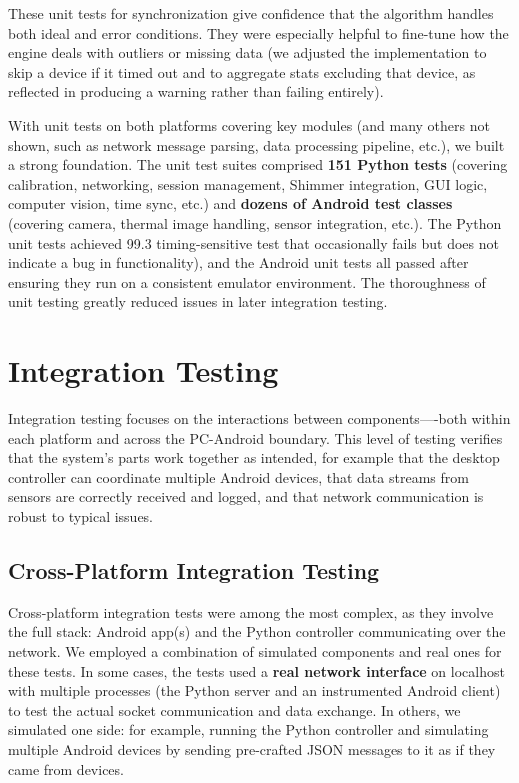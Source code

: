 \documentclass[11pt,a4paper]{report}
\begin{document}
These unit tests for synchronization give confidence that the algorithm
handles both ideal and error conditions. They were especially helpful to
fine-tune how the engine deals with outliers or missing data (we
adjusted the implementation to skip a device if it timed out and to
aggregate stats excluding that device, as reflected in producing a
warning rather than failing entirely).

With unit tests on both platforms covering key modules (and many others
not shown, such as network message parsing, data processing pipeline,
etc.), we built a strong foundation. The unit test suites comprised
\textbf{151 Python tests} (covering calibration, networking, session
management, Shimmer integration, GUI logic, computer vision, time sync,
etc.) and \textbf{dozens of Android test classes} (covering camera, thermal
image handling, sensor integration, etc.). The Python unit tests
achieved 99.3%
timing-sensitive test that occasionally fails but does not indicate a
bug in functionality), and the Android unit tests all passed after
ensuring they run on a consistent emulator environment. The thoroughness
of unit testing greatly reduced issues in later integration testing.

\section{Integration Testing}

Integration testing focuses on the interactions between
components----both within each platform and across the PC-Android
boundary. This level of testing verifies that the system's parts work
together as intended, for example that the desktop controller can
coordinate multiple Android devices, that data streams from sensors are
correctly received and logged, and that network communication is robust
to typical issues.

\subsection{Cross-Platform Integration Testing}

Cross-platform integration tests were among the most complex, as they
involve the full stack: Android app(s) and the Python controller
communicating over the network. We employed a combination of simulated
components and real ones for these tests. In some cases, the tests used
a \textbf{real network interface} on localhost with multiple processes (the
Python server and an instrumented Android client) to test the actual
socket communication and data exchange. In others, we simulated one
side: for example, running the Python controller and simulating multiple
Android devices by sending pre-crafted JSON messages to it as if they
came from devices.
\end{document}
